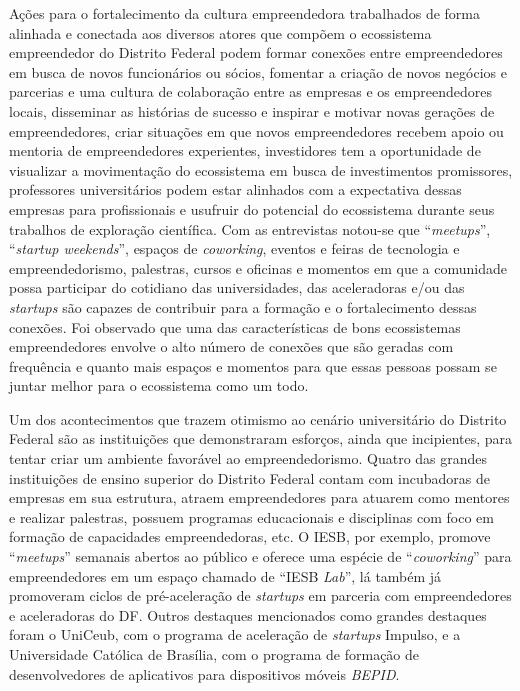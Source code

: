 Ações para o fortalecimento da cultura empreendedora trabalhados de forma alinhada e conectada aos diversos atores que compõem o ecossistema empreendedor do Distrito Federal podem formar conexões entre empreendedores em busca de novos funcionários ou sócios, fomentar a criação de novos negócios e parcerias e uma cultura de colaboração entre as empresas e os empreendedores locais, disseminar as histórias de sucesso e inspirar e motivar novas gerações de empreendedores, criar situações em que novos empreendedores recebem apoio ou mentoria de empreendedores experientes, investidores tem a oportunidade de visualizar a movimentação do ecossistema em busca de investimentos promissores, professores universitários podem estar alinhados com a expectativa dessas empresas para profissionais e usufruir do potencial do ecossistema durante seus trabalhos de exploração científica. Com as entrevistas notou-se que ``\textit{meetups}'', ``\textit{startup weekends}'', espaços de \textit{coworking}, eventos e feiras de tecnologia e empreendedorismo, palestras, cursos e oficinas e momentos em que a comunidade possa participar do cotidiano das universidades, das aceleradoras e/ou das \textit{startups} são capazes de contribuir para a formação e o fortalecimento dessas conexões. Foi observado que uma das características de bons ecossistemas empreendedores envolve o alto número de conexões que são geradas com frequência e quanto mais espaços e momentos para que essas pessoas possam se juntar melhor para o ecossistema como um todo.

Um dos acontecimentos que trazem otimismo ao cenário universitário do Distrito Federal são as instituições que demonstraram esforços, ainda que incipientes, para tentar criar um ambiente favorável ao empreendedorismo. Quatro das grandes instituições de ensino superior do Distrito Federal contam com incubadoras de empresas em sua estrutura, atraem empreendedores para atuarem como mentores e realizar palestras, possuem programas educacionais e disciplinas com foco em formação de capacidades empreendedoras, etc. O IESB, por exemplo, promove ``\textit{meetups}'' semanais abertos ao público e oferece uma espécie de ``\textit{coworking}'' para empreendedores em um espaço chamado de ``IESB \textit{Lab}'', lá também já promoveram ciclos de pré-aceleração de \textit{startups} em parceria com empreendedores e aceleradoras do DF. Outros destaques mencionados como grandes destaques foram o UniCeub, com o programa de aceleração de \textit{startups} Impulso, e a Universidade Católica de Brasília, com o programa de formação de desenvolvedores de aplicativos para dispositivos móveis \textit{BEPID}.

